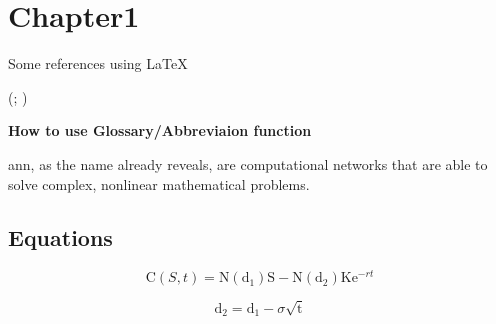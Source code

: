 \section{Chapter1}
	\label{sec:chapter1}

	Some references using \LaTeX

	\citet{de1998little}

	\citet[p.~34]{de1998little}

	\citep{de1998little}

	\citep[p.~34]{de1998little}

	\citep{de1998little,bieger2013}

	(\citealp[p.~3]{de1998little}; \citealp[p.~5]{bieger2013})

	\citep[e.g.][p.~34]{de1998little}

	\textbf{How to use Glossary/Abbreviaion function}

\gls{ann}, as the name already reveals, are computational networks that are able to solve complex, nonlinear mathematical problems.

\subsection{Equations}
	\label{subsec:equ}


	\begin{equation}
	\mathrm C( S, t)= \mathrm N(\mathrm d_1)\mathrm S - \mathrm N(\mathrm d_2) \mathrm K \mathrm e^{-rt}
	\label{eq:1}
	\end{equation}

	\begin{equation}
	\mathrm d_2= \mathrm d_1 - \sigma \sqrt{\mathrm t}
	\label{eq:3}
	\end{equation}

	\newpage
